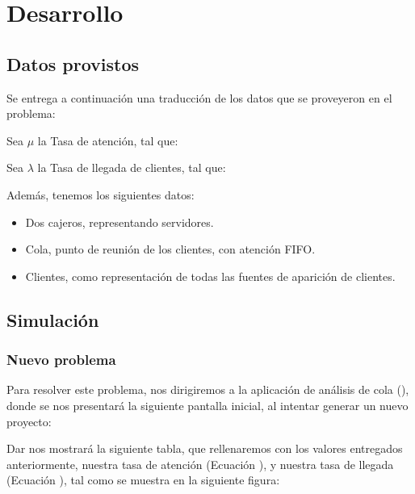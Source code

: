 \section{Desarrollo}
\subsection{Datos provistos}
Se entrega a continuación una traducción de los datos que se proveyeron en el problema:

Sea $\mu$ la Tasa de atención, tal que:

Sea $\lambda$ la Tasa de llegada de clientes, tal que:

Además, tenemos los siguientes datos:
\begin{itemize}
    \item Dos cajeros, representando servidores.
    \item Cola, punto de reunión de los clientes, con atención FIFO.
    \item Clientes, como representación de todas las fuentes de aparición de clientes.
\end{itemize}
\pagebreak

\subsection{Simulación}
\subsubsection{Nuevo problema}
Para resolver este problema, nos dirigiremos a la aplicación de análisis de cola (), donde se nos presentará la siguiente pantalla inicial, al intentar generar un nuevo proyecto:

Dar  nos mostrará la siguiente tabla, que rellenaremos con los valores entregados anteriormente, nuestra tasa de atención (Ecuación ), y nuestra tasa de llegada (Ecuación ), tal como se muestra en la siguiente figura:

